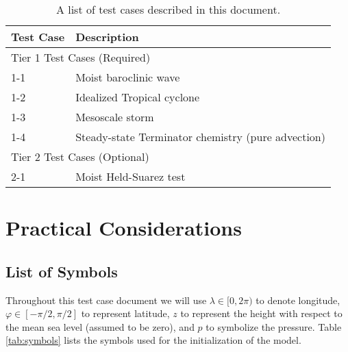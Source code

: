 \documentclass[times,doublespace]{fldauth}
\newcommand\T{\rule{0pt}{2.6ex}}
\newcommand\B{\rule[-1.2ex]{0pt}{0pt}}
\begin{document}
\begin{table}[h]

\caption{A list of test cases described in this document.} \label{tab:TestCases}
\begin{tabular*}{\textwidth}{@{\extracolsep{\fill}}ll}
\hline Test Case \T \B& Description \\
\hline \multicolumn{2}{l}{Tier 1 Test Cases (Required)} \T \B \\
\hline 
1-1 \T & Moist baroclinic wave \\
1-2 \T & Idealized Tropical cyclone \\
1-3 \T & Mesoscale storm \\
1-4 \T & Steady-state Terminator chemistry (pure advection) \\
\hline \multicolumn{2}{l}{Tier 2 Test Cases (Optional)} \T \B \\  \hline 
2-1 \T \B & Moist Held-Suarez test  \\ \hline
\hline 
\end{tabular*}

\end{table}

\section{Practical Considerations}

\subsection{List of Symbols}
Throughout this test case document we will use $\lambda \in [0, 2 \pi)$ to denote longitude, $\varphi \in [-\pi/2, \pi/2]$ to represent latitude, $z$ to represent the height with respect to the mean sea level (assumed to be zero), and $p$ to symbolize the pressure. Table \ref{tab:symbols} lists the symbols used for the initialization of the model.
\end{document}
